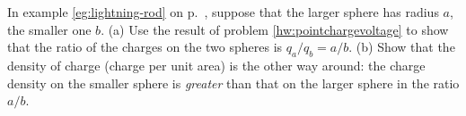 In example \ref{eg:lightning-rod} on p.~\pageref{eg:lightning-rod}, suppose that the
larger sphere has radius $a$, the smaller one $b$. (a) Use the result of problem
\ref{hw:pointchargevoltage} to show that the ratio of the charges on the two spheres
is $q_a/q_b=a/b$. (b) Show that the density of charge (charge per unit area)
is the other way around: the charge density on the smaller sphere is \emph{greater}
than that on the larger sphere in the ratio $a/b$.
